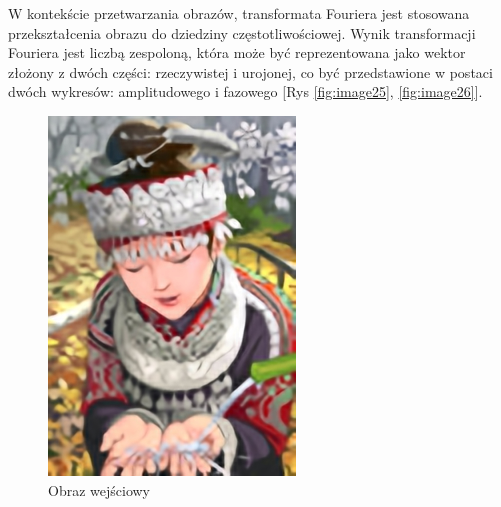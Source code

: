 W kontekście przetwarzania obrazów, transformata Fouriera jest stosowana przekształcenia obrazu do dziedziny częstotliwościowej. Wynik transformacji Fouriera jest liczbą zespoloną, która może być reprezentowana jako wektor złożony z dwóch części: rzeczywistej i urojonej, co być przedstawione w postaci dwóch wykresów: amplitudowego i fazowego [Rys \ref{fig:image25}, \ref{fig:image26}].

\begin{figure}[ht]
    \centering
    \begin{minipage}[t]{0.325\linewidth}
        \includegraphics[width=\linewidth]{Rozdziały/02.Podstawy_teoretyczne/comic_DWSR_x4.png}
        \caption{Obraz wejściowy}
        \label{fig:image24}
    \end{minipage}
    \begin{minipage}[t]{0.325\linewidth}

\end{minipage}
\end{figure}
